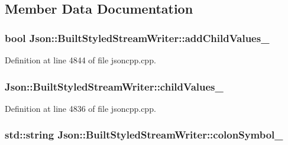 \subsection{Member Data Documentation}
\subsubsection[{\texorpdfstring{add\+Child\+Values\+\_\+}{addChildValues_}}]{\setlength{\rightskip}{0pt plus 5cm}bool Json\+::\+Built\+Styled\+Stream\+Writer\+::add\+Child\+Values\+\_\+\hspace{0.3cm}{\ttfamily [private]}}\hypertarget{struct_json_1_1_built_styled_stream_writer_abed9cc31da503b48798e7cea68c42e16}{}\label{struct_json_1_1_built_styled_stream_writer_abed9cc31da503b48798e7cea68c42e16}


Definition at line 4844 of file jsoncpp.\+cpp.

\subsubsection[{\texorpdfstring{child\+Values\+\_\+}{childValues_}}]{ Json\+::\+Built\+Styled\+Stream\+Writer\+::child\+Values\+\_\+\hspace{0.3cm}{\ttfamily [private]}}\hypertarget{struct_json_1_1_built_styled_stream_writer_a47d562d7874c5b1e68995bd62f575792}{}\label{struct_json_1_1_built_styled_stream_writer_a47d562d7874c5b1e68995bd62f575792}


Definition at line 4836 of file jsoncpp.\+cpp.

\subsubsection[{\texorpdfstring{colon\+Symbol\+\_\+}{colonSymbol_}}]{\setlength{\rightskip}{0pt plus 5cm}std\+::string Json\+::\+Built\+Styled\+Stream\+Writer\+::colon\+Symbol\+\_\+\hspace{0.3cm}{\ttfamily [private]}}\hypertarget{struct_json_1_1_built_styled_stream_writer_ac28b111b1c3ecc1ea6d981c8530ceca4}{}\label{struct_json_1_1_built_styled_stream_writer_ac28b111b1c3ecc1ea6d981c8530ceca4}


